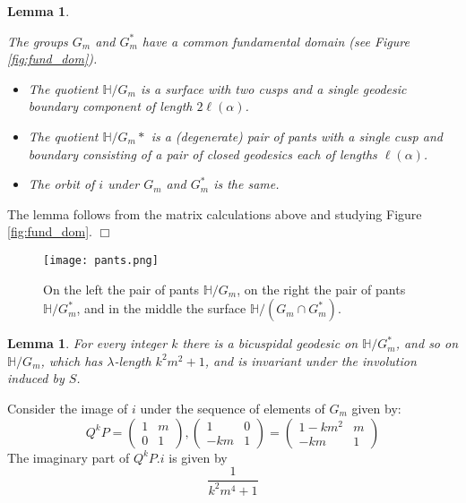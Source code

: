 \documentclass[12pt,a4paper]{amsart}
\newtheorem{lem}[thm]{Lemma}
\def\HH{\mathbb{H}}
\def\GG{G_m}
\begin{document}
\begin{lem}\label{pants}

The groups $\GG$ and $\GG^*$ have a common fundamental domain
 (see Figure \ref{fig:fund_dom}).
\begin{itemize}
\item
The quotient $\HH/\GG$ is a surface with two cusps and a single geodesic
boundary component of length $2\ell(\alpha)$.
\item
The quotient $\HH/\GG*$ is a 
(degenerate) pair of pants with a single cusp and boundary consisting of a pair
of closed geodesics each of lengths $\ell(\alpha)$.
\item The orbit of $i$ under $\GG$ and $\GG^*$ is the same.
\end{itemize}



\end{lem}

\proof The lemma follows from the matrix calculations above and studying Figure
\ref{fig:fund_dom}. \hfill $\Box$

\begin{figure}[ht]
\begin{center}
\texttt{[image: pants.png]}
\end{center}
\caption{On the left the pair of pants $\HH/\GG$,
	on the right  the pair of pants $\HH/\GG^*$,
and in the middle the surface $\HH/(\GG\cap \GG^*)$.}
\label{fig: pants}
\end{figure}

\begin{lem}

	For every integer $k$ there is a bicuspidal geodesic on $\HH/\GG^*$,
	and so on $\HH/\GG$, which has $\lambda$-length $k^2 m^2 +1$, and is
	invariant under the  involution induced by $S$.

\end{lem}

\proof Consider the image of $i$ under the sequence of elements of $\GG$ given by:
$$ Q^kP = 
\begin{pmatrix} 1 & m \\ 0 & 1 \end{pmatrix},\begin{pmatrix} 1 & 0 \\ -km & 1 \end{pmatrix}  
= \begin{pmatrix} 1-km^2 & m \\ -km & 1 \end{pmatrix} $$
The imaginary part of $Q^kP.i$ is given by
$$\frac{1}{ k^2 m^4 + 1}$$
\end{document}
